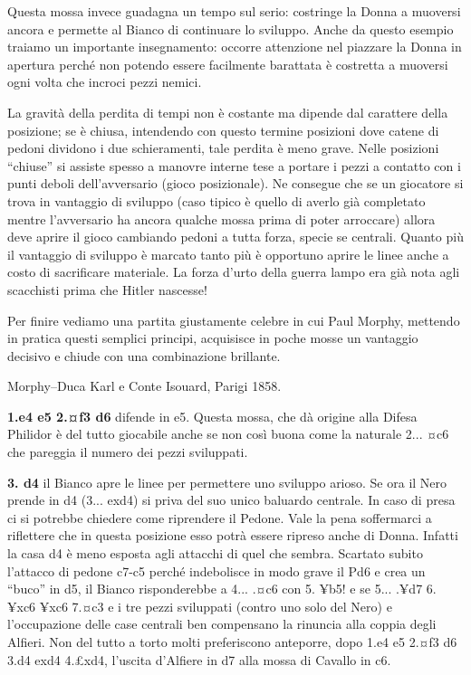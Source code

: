 \documentclass[
]{article}
\begin{document}
Questa mossa invece guadagna un tempo sul serio: costringe la Donna a
muoversi ancora e permette al Bianco di continuare lo sviluppo. Anche da
questo esempio traiamo un importante insegnamento: occorre attenzione
nel piazzare la Donna in apertura perché non potendo essere facilmente
barattata è costretta a muoversi ogni volta che incroci pezzi nemici.

La gravità della perdita di tempi non è costante ma dipende dal
carattere della posizione; se è chiusa, intendendo con questo termine
posizioni dove catene di pedoni dividono i due schieramenti, tale
perdita è meno grave. Nelle posizioni ``chiuse'' si assiste spesso a
manovre interne tese a portare i pezzi a contatto con i punti deboli
dell'avversario (gioco posizionale). Ne consegue che se un giocatore si
trova in vantaggio di sviluppo (caso tipico è quello di averlo già
completato mentre l'avversario ha ancora qualche mossa prima di poter
arroccare) allora deve aprire il gioco cambiando pedoni a tutta forza,
specie se centrali. Quanto più il vantaggio di sviluppo è marcato tanto
più è opportuno aprire le linee anche a costo di sacrificare materiale.
La forza d'urto della guerra lampo era già nota agli scacchisti prima
che Hitler nascesse!

Per finire vediamo una partita giustamente celebre in cui Paul Morphy,
mettendo in pratica questi semplici principi, acquisisce in poche mosse
un vantaggio decisivo e chiude con una combinazione brillante.

Morphy--Duca Karl e Conte Isouard, Parigi 1858.

\textbf{1.e4 e5 2.¤f3 d6} difende in e5. Questa mossa, che dà origine
alla Difesa Philidor è del tutto giocabile anche se non così buona come
la naturale 2... ¤c6 che pareggia il numero dei pezzi sviluppati.

\textbf{3. d4} il Bianco apre le linee per permettere uno sviluppo
arioso. Se ora il Nero prende in d4 (3... exd4) si priva del suo unico
baluardo centrale. In caso di presa ci si potrebbe chiedere come
riprendere il Pedone. Vale la pena soffermarci a riflettere che in
questa posizione esso potrà essere ripreso anche di Donna. Infatti la
casa d4 è meno esposta agli attacchi di quel che sembra. Scartato subito
l'attacco di pedone c7-c5 perché indebolisce in modo grave il Pd6 e crea
un ``buco'' in d5, il Bianco risponderebbe a 4... .¤c6 con 5. ¥b5! e se
5... .¥d7 6. ¥xc6 ¥xc6 7.¤c3 e i tre pezzi sviluppati (contro uno solo
del Nero) e l'occupazione delle case centrali ben compensano la rinuncia
alla coppia degli Alfieri. Non del tutto a torto molti preferiscono
anteporre, dopo 1.e4 e5 2.¤f3 d6 3.d4 exd4 4.£xd4, l'uscita d'Alfiere in
d7 alla mossa di Cavallo in c6.
\end{document}
